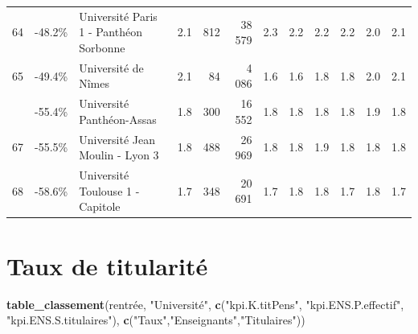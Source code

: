 \documentclass[12pt,french,landscape]{article}
\newenvironment{Shaded}{\begin{snugshade}}{\end{snugshade}}
\newcommand{\KeywordTok}[1]{\textcolor[rgb]{0.13,0.29,0.53}{\textbf{#1}}}
\newcommand{\NormalTok}[1]{#1}
\newcommand{\StringTok}[1]{\textcolor[rgb]{0.31,0.60,0.02}{#1}}
\begin{document}
\begin{longtable}{rrlrrrrrrlrr}
64 & -48.2\% & Université Paris 1 - Panthéon Sorbonne & 2.1 & 812 & 38 579 & 2.3 & 2.2 & 2.2 & 2.2 & 2.0 & 2.1\\
\rowcolor{gray!6}  65 & -49.4\% & Université de Nîmes & 2.1 & 84 & 4 086 & 1.6 & 1.6 & 1.8 & 1.8 & 2.0 & 2.1\\
\addlinespace
66 & -55.4\% & Université Panthéon-Assas & 1.8 & 300 & 16 552 & 1.8 & 1.8 & 1.8 & 1.8 & 1.9 & 1.8\\
\rowcolor{gray!6}  67 & -55.5\% & Université Jean Moulin - Lyon 3 & 1.8 & 488 & 26 969 & 1.8 & 1.8 & 1.9 & 1.8 & 1.8 & 1.8\\
68 & -58.6\% & Université Toulouse 1 - Capitole & 1.7 & 348 & 20 691 & 1.7 & 1.8 & 1.8 & 1.7 & 1.8 & 1.7\\*
\end{longtable}

\newpage

\hypertarget{taux-de-titularituxe9}{%
\section{Taux de titularité}\label{taux-de-titularituxe9}}

\begin{Shaded}
\begin{Highlighting}[]
\KeywordTok{table_classement}\NormalTok{(rentrée, }\StringTok{"Université"}\NormalTok{,}
                  \KeywordTok{c}\NormalTok{(}\StringTok{"kpi.K.titPens"}\NormalTok{, }\StringTok{"kpi.ENS.P.effectif"}\NormalTok{, }\StringTok{"kpi.ENS.S.titulaires"}\NormalTok{),}
                  \KeywordTok{c}\NormalTok{(}\StringTok{"Taux"}\NormalTok{,}\StringTok{"Enseignants"}\NormalTok{,}\StringTok{"Titulaires"}\NormalTok{))}
\end{Highlighting}
\end{Shaded}
\end{document}
